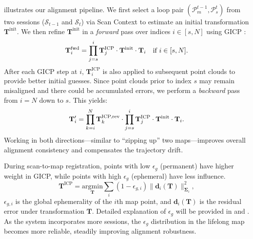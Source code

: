  illustrates our alignment pipeline. 
We first select a loop pair $(\mathcal{P}^{t-1}_{m}, \mathcal{P}^{t}_{s})$ from two sessions ($\mathcal{S}_{t-1}$ and $\mathcal{S}_{t}$) via Scan Context \cite{kim2021scan} to estimate an initial transformation \( \mathbf{T}^{\text{init}} \).  
We then refine \( \mathbf{T}^{\text{init}} \) in a \emph{forward} pass over indices \(i \in [s, N]\) using \ac{GICP} \cite{koide2021voxelized}:
\begin{equation}
\vspace{-1mm}
\mathbf{T}^{\text{fwd}}_i = 
\prod_{j=s}^{i} \mathbf{T}_j^{\text{ICP}} \cdot \mathbf{T}^{\text{init}} \cdot \mathbf{T}_i  \quad \text{if} \ i \in [s, N].
\vspace{-1mm}
\end{equation}
After each \ac{GICP} step at $i$, \(\mathbf{T}_i^{\text{ICP}}\) is also applied to subsequent point clouds to provide better initial guesses.
Since point clouds prior to index \( s \) may remain misaligned and there could be accumulated errors, we perform a \emph{backward} pass from \(i=N\) down to \(s\). This yields:
\begin{equation}
\mathbf{T}'_i = \prod_{k=i}^{N} \mathbf{T}_k^{\text{ICP,rev}} \cdot \prod_{j=s}^{i} \mathbf{T}_j^{\text{ICP}} \cdot \mathbf{T}^{\text{init}} \cdot \mathbf{T}_i.
\vspace{-1mm}
\end{equation}
Working in both directions---similar to ``zipping up'' two maps---improves overall alignment consistency and compensates the trajectory drift.

During scan-to-map registration, points with low $\epsilon_g$ (permanent) have higher weight in \ac{GICP}, while points with high $\epsilon_g$ (ephemeral) have less influence.  
\begin{equation}
    \mathbf{T}^{\text{ICP}} = \underset{\mathbf{T}}{\mathrm{argmin}} \sum\limits_{i} \left( 1 - \epsilon_{g,i} \right) \lVert \mathbf{d}_i(\mathbf{T}) \rVert^2_{\mathbf{\Sigma}_i},
\label{eq:4}
\end{equation}
\(\epsilon_{g,i}\) is the global ephemerality of the $i$th map point, and \(\mathbf{d}_i(\mathbf{T})\) is the residual error under transformation \(\mathbf{T}\).
Detailed explanation of \(\epsilon_{g}\) will be provided in  and .
As the system incorporates more sessions, the $\epsilon_g$ distribution in the lifelong map becomes more reliable, steadily improving alignment robustness.

